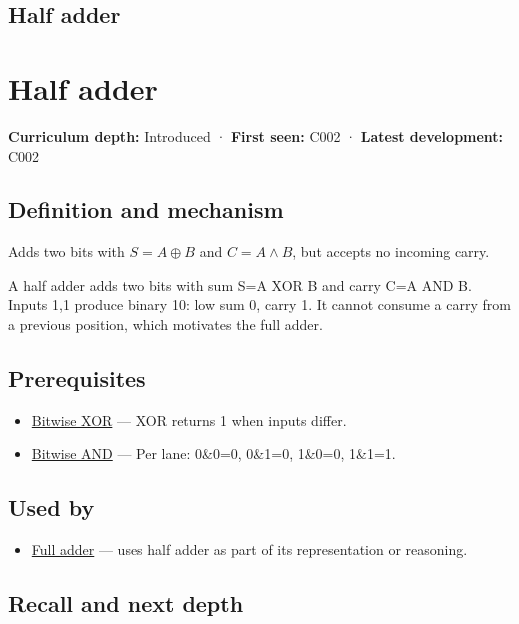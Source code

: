 \hypertarget{appendix-1652d27a8e90}{}
\section*{Half adder}
\chapter{Half adder}\label{appendix-1652d27a8e90-half-adder}

\textbf{Curriculum depth:} Introduced · \textbf{First seen:} C002 · \textbf{Latest development:} C002

\section{Definition and mechanism}\label{appendix-1652d27a8e90-definition-and-mechanism}

Adds two bits with \(S=A\oplus B\) and \(C=A\land B\), but accepts no incoming carry.

A half adder adds two bits with sum S=A XOR B and carry C=A AND B. Inputs 1,1 produce binary 10: low sum 0, carry 1. It cannot consume a carry from a previous position, which motivates the full adder.

\section{Prerequisites}\label{appendix-1652d27a8e90-prerequisites}

\begin{itemize}
\tightlist
\item
  \hyperref[appendix-d49161831368]{Bitwise XOR} --- XOR returns 1 when inputs differ.
\item
  \hyperref[appendix-68b52453737c]{Bitwise AND} --- Per lane: 0\&0=0, 0\&1=0, 1\&0=0, 1\&1=1.
\end{itemize}

\section{Used by}\label{appendix-1652d27a8e90-used-by}

\begin{itemize}
\tightlist
\item
  \hyperref[appendix-d1a5b1e520c2]{Full adder} --- uses half adder as part of its representation or reasoning.
\end{itemize}

\section{Recall and next depth}\label{appendix-1652d27a8e90-recall-and-next-depth}

